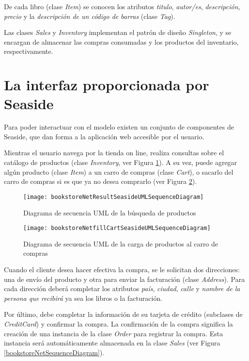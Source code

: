 De cada libro (clase \emph{Item}) se conocen los atributos \emph{titulo}, \emph{autor/es}, \emph{descripción}, \emph{precio} y la \emph{descripción de un código de barras} (clase \emph{Tag}).

Las clases \emph{Sales} y \emph{Inventory} implementan el patrón de diseño \emph{Singleton}\cite{Gamma95}, y se encargan de almacenar las compras consumadas y los productos del inventario, respectivamente.


\section{La interfaz proporcionada por Seaside}

Para poder interactuar con el modelo existen un conjunto de componentes de Seaside, que dan forma a la aplicación web accesible por el usuario.

Mientras el usuario navega por la tienda on line, realiza consultas sobre el catálogo de productos (clase \emph{Inventory}, ver Figura \ref{bookstoreNetResultSequenceDiagram}). A su vez, puede agregar algún producto (clase \emph{Item}) a un carro de compras (clase \emph{Cart}), o sacarlo del carro de compras si es que ya no desea comprarlo (ver Figura \ref{bookstoreNetfillCartSequenceDiagram}).

\begin{figure}[ht!]
\centering
\texttt{[image: bookstoreNetResultSeasideUMLSequenceDiagram]}
\caption{Diagrama de secuencia UML de la búsqueda de productos}
\label{bookstoreNetResultSequenceDiagram}
\end{figure}

\begin{figure}[ht!]
\centering
\texttt{[image: bookstoreNetfillCartSeasideUMLSequenceDiagram]}
\caption{Diagrama de secuencia UML de la carga de productos al carro de compras}
\label{bookstoreNetfillCartSequenceDiagram}
\end{figure}

Cuando el cliente desea hacer efectiva la compra, se le solicitan dos direcciones: una de envío del producto y otra para enviar la facturación (clase \emph{Address}). Para cada dirección deberá completar los atributos \emph{país}, \emph{ciudad}, \emph{calle} y \emph{nombre de la persona que recibirá} ya sea los libros o la facturación.

Por último, debe completar la información de su tarjeta de crédito (subclases de \emph{CreditCard}) y confirmar la compra. La confirmación de la compra significa la creación de una instancia de la clase \emph{Order} para registrar la compra. Esta instancia será automáticamente almacenada en la clase \emph{Sales} (ver Figura \ref{bookstoreNetSequenceDiagram}).

